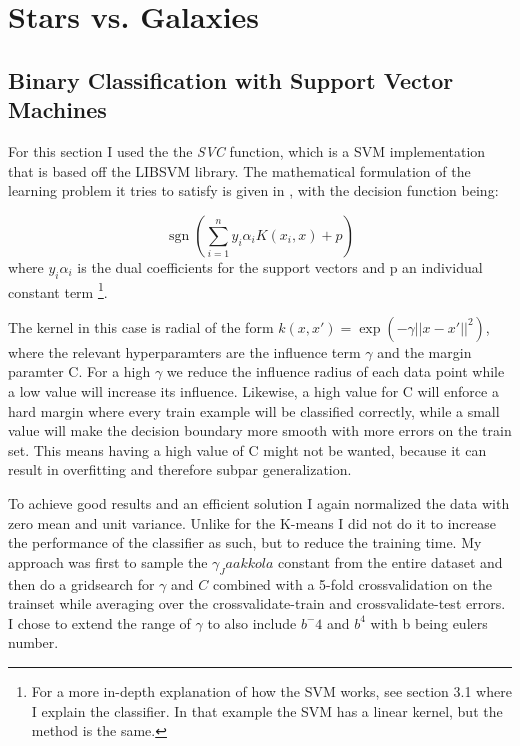 \documentclass{article}
\DeclareMathOperator{\sgn}{sgn}
\theoremstyle{plain}
\theoremstyle{nonumberplain}
\begin{document}
\section{Stars vs. Galaxies}

\subsection{Binary Classification with Support Vector Machines}


For this section I used the the \textit{SVC}\cite{website:svm-sklearn} function, which is a SVM implementation that is based off the LIBSVM \cite{website:libsvm} library.
The mathematical formulation of the learning problem it tries to satisfy is given in \cite[1.2.7.1. SVC]{website:svm-sklearn}, with the decision function being:

\begin{equation} \label{svm}
\sgn{(\sum_{i=1}^n y_i \alpha_i K(x_i,x) + p)}
\end{equation}
where $y_i\alpha_i$ is the dual coefficients for the support vectors and p an individual constant term \footnote{For a more in-depth explanation of how the SVM works, see section 3.1 where I explain the classifier. In that example the SVM has a linear kernel, but the method is the same.}.

The kernel in this case is radial of the form $k(x,x') = \exp{ (-\gamma || x - x' ||^2) }$, where the relevant hyperparamters are the influence term $\gamma$ and the margin paramter C. For a high $\gamma$ we reduce the influence radius of each data point while a low value will increase its influence.
Likewise, a high value for C will enforce a hard margin where every train example will be classified correctly, while a small value will make the decision boundary more smooth with more errors on the train set.
This means having a high value of C might not be wanted, because it can result in overfitting and therefore subpar generalization. 

To achieve good results and an efficient solution I again normalized the data with zero mean and unit variance.
Unlike for the K-means I did not do it to increase the performance of the classifier as such, but to reduce the training time. 
My approach was first to sample the $\gamma_Jaakkola$ constant from the entire dataset and then do a gridsearch for $\gamma$ and $C$ combined with a 5-fold crossvalidation on the trainset while averaging over the crossvalidate-train and crossvalidate-test errors.
I chose to extend the range of $\gamma$ to also include $b^-4$ and $b^4$ with b being eulers number. 
\end{document}
